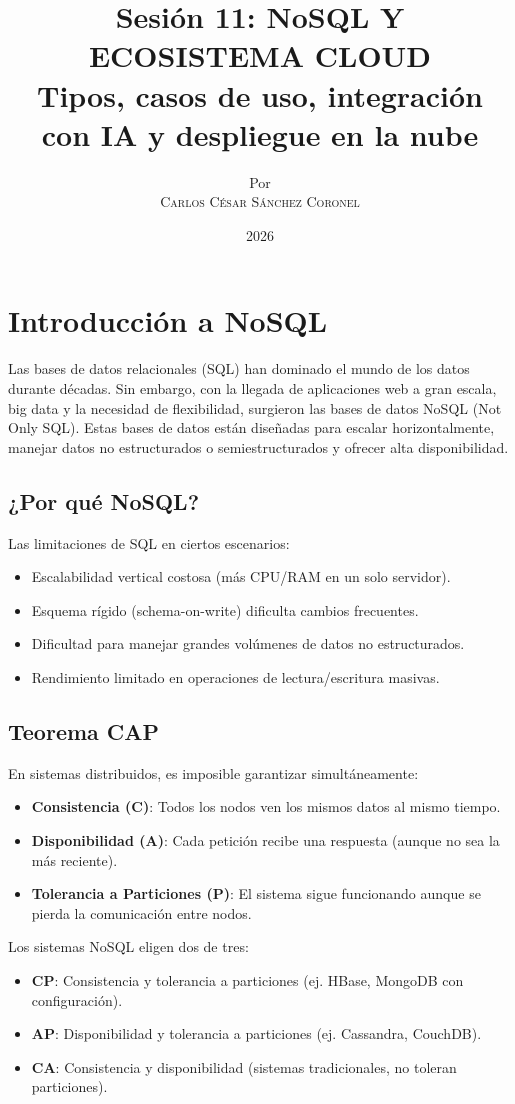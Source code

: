 \documentclass[12pt,a4paper,openany,oneside]{book}
\title{
    \Huge \textbf{Sesión 11: NoSQL Y ECOSISTEMA CLOUD} \\
    \large Tipos, casos de uso, integración con IA y despliegue en la nube
}
\author{
    \small Por \\ \vspace{0.2cm}
    \Large \textsc{Carlos César Sánchez Coronel}
}
\date{2026}
\begin{document}
\maketitle

\tableofcontents
{}

\chapter{Introducción a NoSQL}
Las bases de datos relacionales (SQL) han dominado el mundo de los datos durante décadas. Sin embargo, con la llegada de aplicaciones web a gran escala, big data y la necesidad de flexibilidad, surgieron las bases de datos NoSQL (Not Only SQL). Estas bases de datos están diseñadas para escalar horizontalmente, manejar datos no estructurados o semiestructurados y ofrecer alta disponibilidad.

\section{¿Por qué NoSQL?}
Las limitaciones de SQL en ciertos escenarios:
\begin{itemize}
    \item Escalabilidad vertical costosa (más CPU/RAM en un solo servidor).
    \item Esquema rígido (schema-on-write) dificulta cambios frecuentes.
    \item Dificultad para manejar grandes volúmenes de datos no estructurados.
    \item Rendimiento limitado en operaciones de lectura/escritura masivas.
\end{itemize}

\section{Teorema CAP}
En sistemas distribuidos, es imposible garantizar simultáneamente:
\begin{itemize}
    \item \textbf{Consistencia (C)}: Todos los nodos ven los mismos datos al mismo tiempo.
    \item \textbf{Disponibilidad (A)}: Cada petición recibe una respuesta (aunque no sea la más reciente).
    \item \textbf{Tolerancia a Particiones (P)}: El sistema sigue funcionando aunque se pierda la comunicación entre nodos.
\end{itemize}
Los sistemas NoSQL eligen dos de tres:
\begin{itemize}
    \item \textbf{CP}: Consistencia y tolerancia a particiones (ej. HBase, MongoDB con configuración).
    \item \textbf{AP}: Disponibilidad y tolerancia a particiones (ej. Cassandra, CouchDB).
    \item \textbf{CA}: Consistencia y disponibilidad (sistemas tradicionales, no toleran particiones).
\end{itemize}
\end{document}
